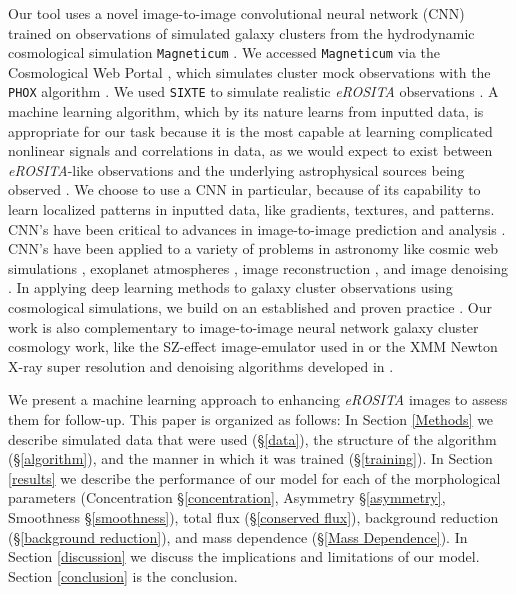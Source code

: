 \documentclass[twocolumn, 11pt]{aastex63}%
\begin{document}
Our tool uses a novel image-to-image convolutional neural network (CNN) trained on observations of simulated galaxy clusters from the hydrodynamic cosmological simulation \texttt{Magneticum} \citep{magneticum}. We accessed \texttt{Magneticum} via the Cosmological Web Portal \citep{cosmo_web_portal}, which simulates cluster mock observations with the \texttt{PHOX} algorithm \citep{PHOX1,PHOX2}. We used \texttt{SIXTE} to simulate realistic \textit{eROSITA} observations \citep{SIXTE}. A machine learning algorithm, which by its nature learns from inputted data, is appropriate for our task because it is the most capable at learning complicated nonlinear signals and correlations in data, as we would expect to exist between \textit{eROSITA}-like observations and the underlying astrophysical sources being observed \citep[see][for a review of deep learning]{Schmidhuber_2014}. We choose to use a CNN in particular, because of its capability to learn localized patterns in inputted data, like gradients, textures, and patterns. CNN's have been critical to advances in image-to-image prediction and analysis \citep[e.g.,][]{UNET,ploss}. CNN's have been applied to a variety of problems in astronomy like cosmic web simulations \citep{Rodriguez_2018}, exoplanet atmospheres \citep{Zingales_2018}, image reconstruction \citep{Flamary_2016}, and image denoising \citep{Vojtekova_2021}. In applying deep learning methods to galaxy cluster observations using cosmological simulations, we build on an established and proven practice \citep[see e.g.,][]{Ntampaka_2015,Green_2019,Ntampaka_2019}. Our work is also complementary to image-to-image neural network galaxy cluster cosmology work, like the SZ-effect image-emulator used in \citet{Rothschild_2022} or the XMM Newton X-ray super resolution and denoising algorithms developed in \citet{Sweere_2022}.

We present a machine learning approach to enhancing \textit{eROSITA} images to assess them for follow-up. This paper is organized as follows: In Section \ref{Methods} we describe simulated data that were used (\S\ref{data}), the structure of the algorithm (\S\ref{algorithm}), and the manner in which it was trained (\S\ref{training}). In Section \ref{results} we describe the performance of our model for each of the morphological parameters (Concentration \S\ref{concentration}, Asymmetry \S\ref{asymmetry}, Smoothness \S\ref{smoothness}), total flux (\S\ref{conserved flux}), background reduction (\S\ref{background reduction}), and mass dependence (\S\ref{Mass Dependence}). In Section \ref{discussion} we discuss the implications and limitations of our model. Section \ref{conclusion} is the conclusion.
\end{document}
